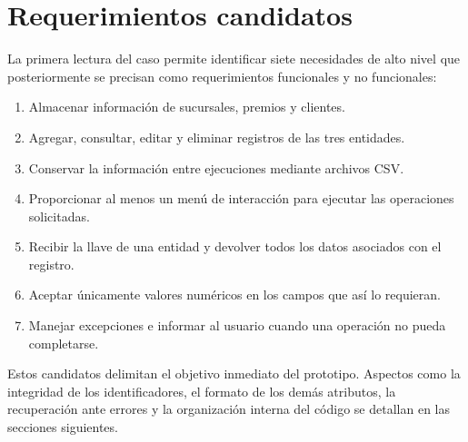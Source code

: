 \section{Requerimientos candidatos}

La primera lectura del caso permite identificar siete necesidades de alto nivel
que posteriormente se precisan como requerimientos funcionales y no
funcionales:

\begin{enumerate}[label=\textbf{RC-\arabic*.}, leftmargin=*]
    \item Almacenar información de sucursales, premios y clientes.
    \item Agregar, consultar, editar y eliminar registros de las tres entidades.
    \item Conservar la información entre ejecuciones mediante archivos CSV.
    \item Proporcionar al menos un menú de interacción para ejecutar las
    operaciones solicitadas.
    \item Recibir la llave de una entidad y devolver todos los datos asociados
    con el registro.
    \item Aceptar únicamente valores numéricos en los campos que así lo
    requieran.
    \item Manejar excepciones e informar al usuario cuando una operación no
    pueda completarse.
\end{enumerate}

Estos candidatos delimitan el objetivo inmediato del prototipo. Aspectos como
la integridad de los identificadores, el formato de los demás atributos, la
recuperación ante errores y la organización interna del código se detallan en
las secciones siguientes.
